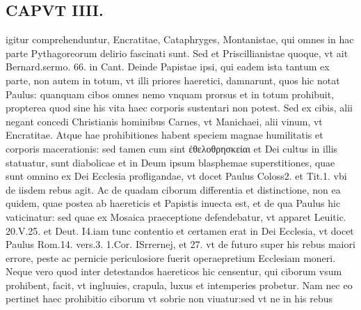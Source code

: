 \documentclass{article}
\begin{document}
\begin{pages}
\section*{CAPVT  IIII. }
\marginpar{[ p.189 ]}\pstart igitur comprehenduntur, Encratitae, Cataphryges, Montanistae, qui omnes in hac parte Pythagoreorum delirio fascinati sunt. Sed et Priscillianistae quoque, vt ait Bernard.sermo. 66. in Cant. Deinde Papistae ipsi, qui eadem ista tantum ex parte, non autem in totum, vt illi priores haeretici, damnarunt, quos hic notat Paulus: quanquam cibos omnes nemo vnquam prorsus et in totum prohibuit, propterea quod sine his vita haec corporis sustentari non potest. Sed ex cibis, alii negant concedi Christianis hominibus Carnes, vt Manichaei, alii vinum, vt Encratitae. Atque hae prohibitiones habent speciem magnae humilitatis et corporis macerationis: sed tamen cum sint ἐθελοθρησκείαι et Dei cultus in illis statuatur, sunt diabolicae et in Deum ipsum blasphemae superstitiones, quae sunt omnino ex Dei Ecclesia profligandae, vt docet Paulus Coloss2. et Tit.1. vbi de iisdem rebus agit. Ac de quadam ciborum differentia et distinctione, non ea quidem, quae postea ab haereticis et Papistis inuecta est, et de qua Paulus hic vaticinatur: sed quae ex Mosaica praeceptione defendebatur, vt apparet Leuitic. 20.V.25. et Deut. I4.iam tunc contentio et certamen erat in Dei Ecclesia, vt docet Paulus Rom.14. vers.3. 1.Cor. ISrrernej, et 27. vt de futuro super his rebus maiori errore, peste ac pernicie periculosiore fuerit operaepretium Ecclesiam moneri. Neque vero quod inter detestandos haereticos hic censentur, qui ciborum vsum prohibent, facit, vt ingluuies, crapula, luxus et intemperies probetur. Nam nec eo pertinet haec prohibitio ciborum vt sobrie non viuatur:sed vt ne in his rebus  \pend

\end{pages}
\end{document}
